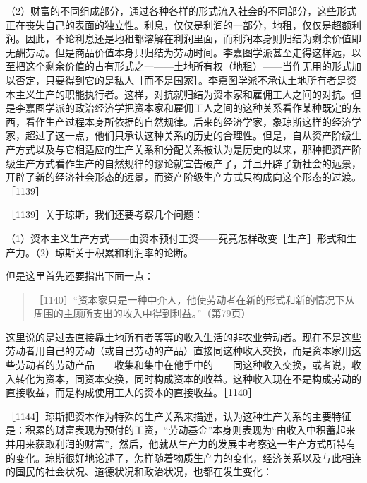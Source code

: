 （2）财富的不同组成部分，通过各种各样的形式流入社会的不同部分，这些形式正在丧失自己的表面的独立性。利息，仅仅是利润的一部分，地租，仅仅是超额利润。因此，不论利息还是地租都溶解在利润里面，而利润本身则归结为剩余价值即无酬劳动。但是商品价值本身只归结为劳动时间。李嘉图学派甚至走得这样远，以至把这个剩余价值的占有形式之一——土地所有权（地租）——当作无用的形式加以否定，只要得到它的是私人［而不是国家］。李嘉图学派不承认土地所有者是资本主义生产的职能执行者。这样，对抗就归结为资本家和雇佣工人之间的对抗。但是李嘉图学派的政治经济学把资本家和雇佣工人之间的这种关系看作某种既定的东西，看作生产过程本身所依据的自然规律。后来的经济学家，象琼斯这样的经济学家，超过了这一点，他们只承认这种关系的历史的合理性。但是，自从资产阶级生产方式以及与它相适应的生产关系和分配关系被认为是历史的以来，那种把资产阶级生产方式看作生产的自然规律的谬论就宣告破产了，并且开辟了新社会的远景，开辟了新的经济社会形态的远景，而资产阶级生产方式只构成向这个形态的过渡。［1139］

［1139］关于琼斯，我们还要考察几个问题：

（1）资本主义生产方式——由资本预付工资——究竟怎样改变［生产］形式和生产力。（2）琼斯关于积累和利润率的论断。

但是这里首先还要指出下面一点：

\begin{quote}{［1140］“资本家只是一种中介人，他使劳动者在新的形式和新的情况下从周围的主顾所支出的收入中得到利益。”（第79页）}\end{quote}

这里说的是过去直接靠土地所有者等等的收入生活的非农业劳动者。现在不是这些劳动者用自己的劳动（或自己劳动的产品）直接同这种收入交换，而是资本家用这些劳动者的劳动产品——收集和集中在他手中的——同这种收入交换，或者说，收入转化为资本，同资本交换，同时构成资本的收益。这种收入现在不是构成劳动的直接收益，而是构成使用工人的资本的直接收益。［1140］

［1144］琼斯把资本作为特殊的生产关系来描述，认为这种生产关系的主要特征是：积累的财富表现为预付的工资，“劳动基金”本身则表现为“由收入中积蓄起来并用来获取利润的财富”，然后，他就从生产力的发展中考察这一生产方式所特有的变化。琼斯很好地论述了，怎样随着物质生产力的变化，经济关系以及与此相连的国民的社会状况、道德状况和政治状况，也都在发生变化：

